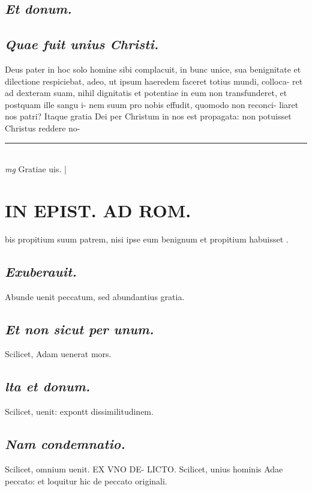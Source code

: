 \documentclass{article}
\begin{document}
\begin{pages}
\subsection*{\textit{Et donum. }}
{}
\subsection*{\textit{Quae fuit unius Christi. }}\pstart Deus pater in hoc solo homine sibi complacuit, in bunc unice, sua benignitate et dilectione respiciebat, adeo, ut ipsum haeredem faceret totius mundi, colloca- ret ad dexteram suam, nihil dignitatis et potentiae in eum non transfunderet, et postquam ille sangu i- nem suum pro nobis effudit, quomodo non reconci- liaret nos patri? Itaque gratia Dei per Christum in nos est propagata: non potuisset Christus reddere no-  \pend
\vspace{0.5cm}\noindent
\vspace{0.2cm}\rule{1cm}{0.2pt}\\ 
\hspace{0.2cm}\textit{mg}
\footnotesize Gratiae uis. 
\normalsize| 
\section*{IN EPIST. AD ROM.  }
\marginpar{[ p.54 ]}\pstart bis propitium suum patrem, nisi ipse eum benignum et propitium habuisset .  \pend
{}
{}
\subsection*{\textit{Exuberauit. }}\pstart Abunde uenit peccatum, sed abundantius gratia.   \pend
{}
{}
\subsection*{\textit{Et non sicut per unum. }}\pstart Scilicet, Adam uenerat mors.   \pend
{}
{}
\subsection*{\textit{lta et donum. }}\pstart Scilicet, uenit: expontt dissimilitudinem.   \pend
{}
{}
\subsection*{\textit{Nam condemnatio. }}\pstart Scilicet, omnium uenit. EX VNO DE- LICTO. Scilicet, unius hominis Adae peccato: et loquitur hic de peccato originali.   \pend
{}
{}

\end{pages}
\end{document}
